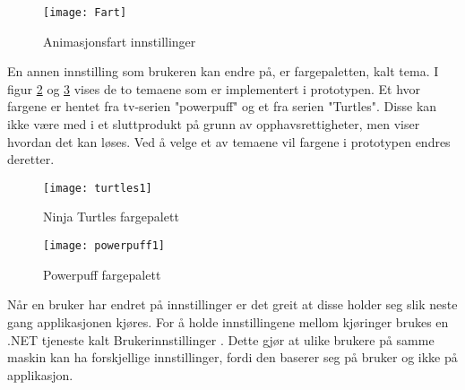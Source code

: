 \begin{figure}
\centering
\texttt{[image: Fart]}
\caption{Animasjonsfart innstillinger}
\label{fig:fart}
\end{figure}

En annen innstilling som brukeren kan endre på, er fargepaletten, kalt tema. I figur \ref{fig:my_label1} og \ref{fig:my_label2} vises de to temaene som er implementert i prototypen. Et hvor fargene er hentet fra tv-serien "powerpuff" og et fra serien "Turtles". Disse kan ikke være med i et sluttprodukt på grunn av opphavsrettigheter, men viser hvordan det kan løses. Ved å velge et av temaene vil fargene i prototypen endres deretter.

\begin{figure}
\centering
\texttt{[image: turtles1]}
\caption{Ninja Turtles fargepalett }
\label{fig:my_label1}
\end{figure}

\begin{figure}
\centering
\texttt{[image: powerpuff1]}
\caption{Powerpuff fargepalett }
\label{fig:my_label2}
\end{figure}


Når en bruker har endret på innstillinger er det greit at disse holder seg slik neste gang applikasjonen kjøres. For å holde innstillingene mellom kjøringer brukes en .NET tjeneste kalt Brukerinnstillinger \cite{Using812:online}. Dette gjør at ulike brukere på samme maskin kan ha forskjellige innstillinger, fordi den baserer seg på bruker og ikke på applikasjon.


